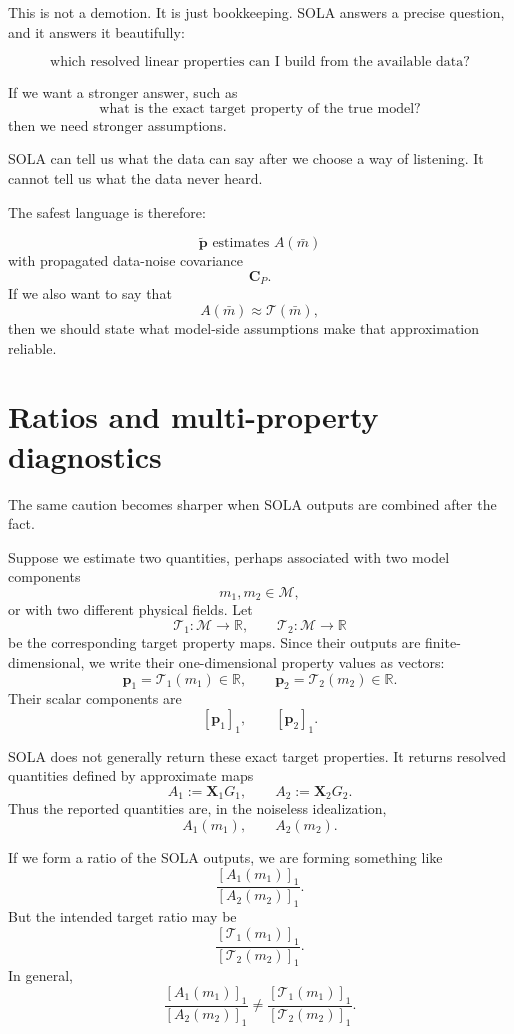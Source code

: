 \documentclass[11pt,openany]{book}
\theoremstyle{definition}
\theoremstyle{remark}
\newcommand{\M}{\mathcal M}
\newcommand{\Tau}{\mathcal{T}}
\begin{document}
This is not a demotion. It is just bookkeeping. SOLA answers a precise question, and it answers
it beautifully:

\[
  \text{which resolved linear properties can I build from the available data?}
\]

If we want a stronger answer, such as
\[
  \text{what is the exact target property of the true model?}
\]
then we need stronger assumptions.

\begin{intuitionbox}
SOLA can tell us what the data can say after we choose a way of listening. It cannot tell us what
the data never heard.
\end{intuitionbox}

The safest language is therefore:

\[
  \widetilde{\mathbf p}
  \text{ estimates }
  A(\bar m)
\]
with propagated data-noise covariance
\[
  \mathbf C_P.
\]
If we also want to say that
\[
  A(\bar m)\approx\Tau(\bar m),
\]
then we should state what model-side assumptions make that approximation reliable.

\section{Ratios and multi-property diagnostics}

The same caution becomes sharper when SOLA outputs are combined after the fact.

Suppose we estimate two quantities, perhaps associated with two model components
\[
  m_1,m_2\in\M,
\]
or with two different physical fields. Let
\[
  \Tau_1:\M\to\mathbb R,
  \qquad
  \Tau_2:\M\to\mathbb R
\]
be the corresponding target property maps. Since their outputs are finite-dimensional, we write
their one-dimensional property values as vectors:
\[
  \mathbf p_1=\Tau_1(m_1)\in\mathbb R,
  \qquad
  \mathbf p_2=\Tau_2(m_2)\in\mathbb R.
\]
Their scalar components are
\[
  [\mathbf p_1]_1,
  \qquad
  [\mathbf p_2]_1.
\]

SOLA does not generally return these exact target properties. It returns resolved quantities
defined by approximate maps
\[
  A_1:=\mathbf X_1G_1,
  \qquad
  A_2:=\mathbf X_2G_2.
\]
Thus the reported quantities are, in the noiseless idealization,
\[
  A_1(m_1),
  \qquad
  A_2(m_2).
\]

If we form a ratio of the SOLA outputs, we are forming something like
\[
  \frac{[A_1(m_1)]_1}{[A_2(m_2)]_1}.
\]
But the intended target ratio may be
\[
  \frac{[\Tau_1(m_1)]_1}{[\Tau_2(m_2)]_1}.
\]
In general,
\[
  \frac{[A_1(m_1)]_1}{[A_2(m_2)]_1}
  \neq
  \frac{[\Tau_1(m_1)]_1}{[\Tau_2(m_2)]_1}.
\]
\end{document}
